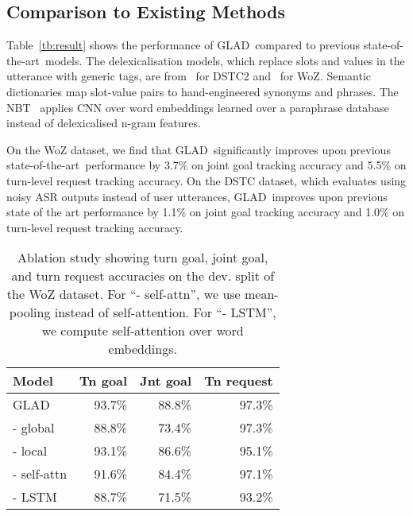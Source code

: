 \documentclass[11pt,a4paper]{article}
\newcommand{\modelnameshort}{GLAD}
\newcommand{\sota}{state-of-the-art}
\newcommand{\goaldiff}{3.7}  \newcommand{\requestdiff}{5.5}  \newcommand{\turngoalacc}{93.1}
\newcommand{\dstcgoaldiff}{1.1}  \newcommand{\dstcrequestdiff}{1.0}  \newcommand{\dstcgoalacc}{74.5}
\begin{document}
\subsection{Comparison to Existing Methods}

Table~\ref{tb:result} shows the performance of \modelnameshort~compared to previous \sota~models.
The delexicalisation models, which replace slots and values in the utterance with generic tags, are from~\citet{henderson2014word} for DSTC2 and~\citet{wen2017NetworkBasedEndToEndDialogueSystem} for WoZ.
Semantic dictionaries map slot-value pairs to hand-engineered synonyms and phrases.
The NBT~\citep{mrkvsic2016neural} applies CNN over word embeddings learned over a paraphrase database~\citep{wieting2015paraphrase} instead of delexicalised n-gram features.

On the WoZ dataset, we find that \modelnameshort~significantly improves upon previous \sota~performance by \goaldiff\% on joint goal tracking accuracy and \requestdiff\% on turn-level request tracking accuracy.
On the DSTC dataset, which evaluates using noisy ASR outputs instead of user utterances, \modelnameshort~improves upon previous state of the art performance by \dstcgoaldiff\% on joint goal tracking accuracy and \dstcrequestdiff\% on turn-level request tracking accuracy.



\begin{table}[t]
\centering
\begin{tabular}{lrrr}
\toprule
Model                    & Tn goal & Jnt goal & Tn request \\
\midrule
\modelnameshort          & 93.7\%  & 88.8\%  & 97.3\%  \\
- global         & 88.8\%  & 73.4\%  & 97.3\%  \\
- local          & 93.1\%  & 86.6\%  & 95.1\%  \\
- self-attn         & 91.6\%  & 84.4\%  & 97.1\%  \\
- LSTM                   & 88.7\%  & 71.5\%  & 93.2\%  \\
\bottomrule
\end{tabular}
\caption{
Ablation study showing turn goal, joint goal, and turn request accuracies on the dev. split of the WoZ dataset.
For ``- self-attn'', we use mean-pooling instead of self-attention.
For ``- LSTM'', we compute self-attention over word embeddings.
}
\label{tb:ablation}
\vspace{-0.2cm}
\end{table}
\end{document}
